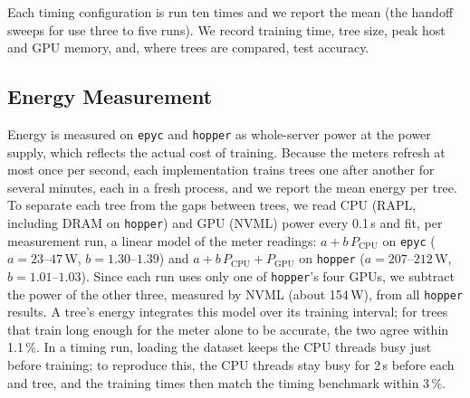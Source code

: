 Each timing configuration is run ten times and we report the mean (the handoff sweeps for \ImplHybrid{} use three to five runs). We record training time, tree size, peak host and GPU memory, and, where trees are compared, test accuracy.

\subsection{Energy Measurement}
\label{sec:energy-method}

Energy is measured on \texttt{epyc} and \texttt{hopper} as whole-server power at the power supply, which reflects the actual cost of training. Because the meters refresh at most once per second, each implementation trains trees one after another for several minutes, each in a fresh process, and we report the mean energy per tree. To separate each tree from the gaps between trees, we read CPU (RAPL, including DRAM on \texttt{hopper}) and GPU (NVML) power every 0.1\,s and fit, per measurement run, a linear model of the meter readings: $a + b\,P_{\mathrm{CPU}}$ on \texttt{epyc} ($a = 23$--$47$\,W, $b = 1.30$--$1.39$) and $a + b\,P_{\mathrm{CPU}} + P_{\mathrm{GPU}}$ on \texttt{hopper} ($a = 207$--$212$\,W, $b = 1.01$--$1.03$). Since each run uses only one of \texttt{hopper}'s four GPUs, we subtract the power of the other three, measured by NVML (about 154\,W), from all \texttt{hopper} results. A tree's energy integrates this model over its training interval; for trees that train long enough for the meter alone to be accurate, the two agree within 1.1\,\%. In a timing run, loading the dataset keeps the CPU threads busy just before training; to reproduce this, the CPU threads stay busy for 2\,s before each \ImplGpu{} and \ImplHybrid{} tree, and the training times then match the timing benchmark within 3\,\%.
